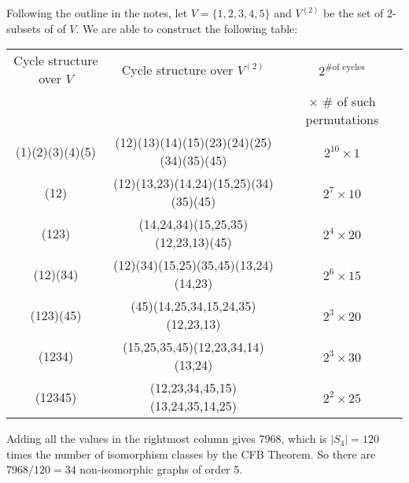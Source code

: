 Following the outline in the notes, let $V = \{ 1,2,3,4,5 \}$ 
and $V^{(2)}$ be the set of 2-subsets of of $V$. 
We are able to construct the following table:\\
\begin{tabular}{c|c|c}
 Cycle structure over $V$&Cycle structure over $V^{(2)}$& $2^{\text{\# of cycles}}$\\
 &&$\times$ \# of such permutations\\
 (1)(2)(3)(4)(5)&(12)(13)(14)(15)(23)(24)(25)(34)(35)(45)& $2^{10} \times 1$\\
 (12)&(12)(13,23)(14,24)(15,25)(34)(35)(45)&$2^{7} \times 10$\\
 (123)&(14,24,34)(15,25,35)(12,23,13)(45)&$2^4 \times 20$\\
 (12)(34)&(12)(34)(15,25)(35,45)(13,24)(14,23)&$2^6 \times 15$\\
 (123)(45)&(45)(14,25,34,15,24,35)(12,23,13)&$2^3 \times 20$\\
 (1234)&(15,25,35,45)(12,23,34,14)(13,24)&$2^3 \times 30$\\
 (12345)&(12,23,34,45,15)(13,24,35,14,25)&$2^2 \times 25$
\end{tabular}
Adding all the values in the rightmost column gives 7968, 
which is $|S_4| = 120$ times the number of isomorphism classes
by the CFB Theorem. 
So there are $7968/120 = 34$ non-isomorphic graphs of order 5.
